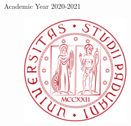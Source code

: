 \begin{titlepage}
	\vspace{0.5\baselineskip} %

	{\small Academic Year 2020-2021}

	\vspace*{4\baselineskip}

	\begin{figure}[!h]
		\centering
		\includegraphics[width=0.5\textwidth]{../frontespizio/UNIPD.png}%
	\end{figure}

	\vfill %

%
%
%
%

\end{titlepage}

\clearpage{\pagestyle{empty}\cleardoublepage}
